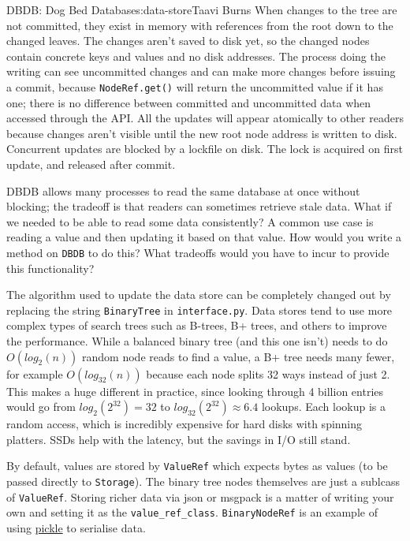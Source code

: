 \begin{aosachapter}{DBDB: Dog Bed Database}{s:data-store}{Taavi Burns}
When changes to the tree are not committed, they exist in memory with
references from the root down to the changed leaves. The changes aren't
saved to disk yet, so the changed nodes contain concrete keys and values
and no disk addresses. The process doing the writing can see uncommitted
changes and can make more changes before issuing a commit, because
\texttt{NodeRef.get()} will return the uncommitted value if it has one;
there is no difference between committed and uncommitted data when
accessed through the API. All the updates will appear atomically to
other readers because changes aren't visible until the new root node
address is written to disk. Concurrent updates are blocked by a lockfile
on disk. The lock is acquired on first update, and released after
commit.

\label{exercises-for-the-reader}

DBDB allows many processes to read the same database at once without
blocking; the tradeoff is that readers can sometimes retrieve stale
data. What if we needed to be able to read some data consistently? A
common use case is reading a value and then updating it based on that
value. How would you write a method on \texttt{DBDB} to do this? What
tradeoffs would you have to incur to provide this functionality?

The algorithm used to update the data store can be completely changed
out by replacing the string \texttt{BinaryTree} in
\texttt{interface.py}. Data stores tend to use more complex types of
search trees such as B-trees, B+ trees, and others to improve the
performance. While a balanced binary tree (and this one isn't) needs to
do $O(log_2(n))$ random node reads to find a value, a B+ tree needs many
fewer, for example $O(log_{32}(n))$ because each node splits 32 ways
instead of just 2. This makes a huge different in practice, since
looking through 4 billion entries would go from $log_2(2^{32}) = 32$ to
$log_{32}(2^{32}) \approx 6.4$ lookups. Each lookup is a random access,
which is incredibly expensive for hard disks with spinning platters.
SSDs help with the latency, but the savings in I/O still stand.

By default, values are stored by \texttt{ValueRef} which expects bytes
as values (to be passed directly to \texttt{Storage}). The binary tree
nodes themselves are just a sublcass of \texttt{ValueRef}. Storing
richer data via json or msgpack is a matter of writing your own and
setting it as the \texttt{value\_ref\_class}. \texttt{BinaryNodeRef} is
an example of using
\href{https://docs.python.org/3.4/library/pickle.html}{pickle} to
serialise data.


\end{aosachapter}
